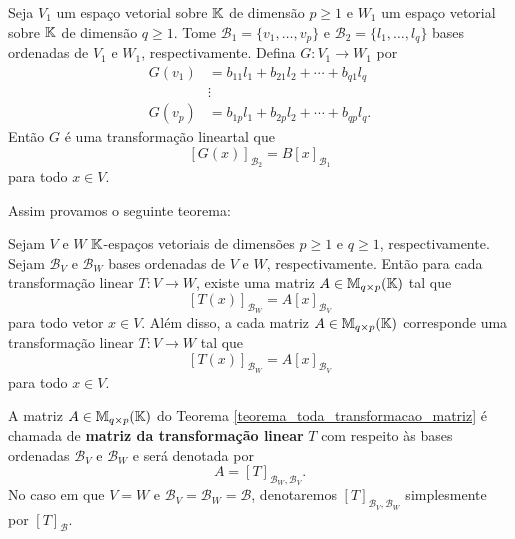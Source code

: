Seja $V_1$ um espaço vetorial sobre $\mathbb{K}$ de dimensão $p \ge 1$ e $W_1$ um espaço vetorial sobre $\mathbb{K}$ de dimensão $q \ge 1$. Tome $\mathcal{B}_1 = \{v_1,\dots,v_p\}$ e $\mathcal{B}_2 = \{l_1,\dots,l_q\}$ bases ordenadas de $V_1$ e $W_1$, respectivamente. Defina $G \colon V_1 \to W_1$ por
\begin{align*}
    G(v_1) &= b_{11}l_1 + b_{21}l_2 + \cdots + b_{q1}l_q\\
    &\vdots\\
    G(v_p) &= b_{1p}l_1 + b_{2p}l_2 + \cdots + b_{qp}l_q.
\end{align*}
Então $G$ é uma transformação lineartal que
\[
    [G(x)]_{\mathcal{B}_2} = B[x]_{\mathcal{B}_1}
\]
para todo $x \in V$.

Assim provamos o seguinte teorema:
\begin{teorema}\label{teorema_toda_transformacao_matriz}
    Sejam $V$ e $W$ $\mathbb{K}$-espaços vetoriais de dimensões $p \ge 1$ e $q \ge 1$, respectivamente. Sejam $\mathcal{B}_V$ e $\mathcal{B}_W$ bases ordenadas de $V$ e $W$, respectivamente. Então para cada transformação linear $T \colon V \to W$, existe uma matriz $A \in \mathbb{M}_{q\times p}(\mathbb{K})$ tal que
    \[
        [T(x)]_{\mathcal{B}_W} = A[x]_{\mathcal{B}_V}
    \]
    para todo vetor $x \in V$. Além disso, a cada matriz $A \in \mathbb{M}_{q\times p}(\mathbb{K})$ corresponde uma transformação linear $T \colon V \to W$ tal que
    \[
        [T(x)]_{\mathcal{B}_W} = A[x]_{\mathcal{B}_V}
    \]
    para todo $x \in V$.
\end{teorema}

\begin{definicao}
    A matriz $A \in \mathbb{M}_{q\times p}(\mathbb{K})$ do Teorema \ref{teorema_toda_transformacao_matriz} é chamada de \textbf{matriz da transformação linear} $T$ com respeito \`as bases ordenadas $\mathcal{B}_V$ e $\mathcal{B}_W$ e será denotada por
    \[
        A = [T]_{\mathcal{B}_{W},\mathcal{B}_{V}}.
    \]
    No caso em que $V = W$ e $\mathcal{B}_V = \mathcal{B}_W = \mathcal{B}$, denotaremos $[T]_{\mathcal{B}_{V},\mathcal{B}_{W}}$ simplesmente por $[T]_\mathcal{B}$.
\end{definicao}

